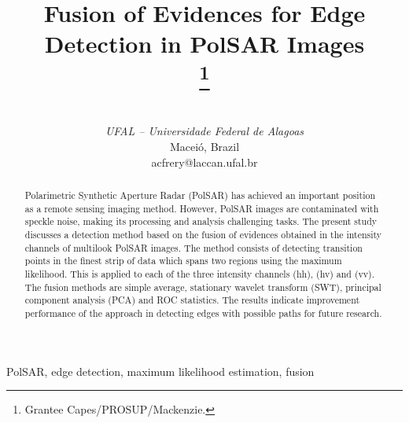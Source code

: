 \documentclass[conference]{IEEEtran}
\begin{document}
\title{Fusion of Evidences for Edge Detection in PolSAR Images\\
\thanks{Grantee Capes/PROSUP/Mackenzie.}
}
\author{
\and
{}
\and
{}
 \\
\textit{UFAL -- Universidade Federal de Alagoas}\\
Maceió, Brazil \\
acfrery@laccan.ufal.br}
\maketitle
\begin{abstract}
Polarimetric Synthetic Aperture Radar (PolSAR) has achieved an important position as a remote sensing imaging method. 
However, PolSAR images are contaminated with speckle noise, making its processing and analysis challenging tasks. 
The present study discusses a detection method based on the fusion of evidences obtained in the intensity channels of multilook PolSAR images.
The method consists of detecting transition points in the finest strip of data which spans two regions using the maximum likelihood.
This is applied to each of the three intensity channels (hh), (hv) and (vv). 
The fusion methods are simple average, stationary wavelet transform (SWT), principal component analysis (PCA) and ROC statistics.  
The results indicate improvement performance of the approach in detecting edges with possible paths for future research.
\end{abstract}

\begin{IEEEkeywords}
PolSAR, edge detection, maximum likelihood estimation, fusion
\end{IEEEkeywords}
\end{document}
